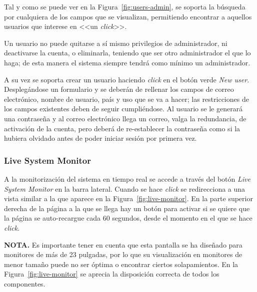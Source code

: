 Tal y como se puede ver en la Figura~\ref{fig:users-admin}, se soporta la búsqueda por cualquiera de los campos que se visualizan, permitiendo encontrar a aquellos usuarios que interese en <<un \textit{click}>>. 


Un usuario no puede quitarse a sí mismo privilegios de administrador, ni deactivarse la cuenta, o eliminarla, teniendo que ser otro administrador el que lo haga; de esta manera el sistema siempre tendrá como mínimo un administrador.

A su vez se soporta crear un usuario haciendo \textit{click} en el botón verde \textit{New user}. Desplegándose un formulario y se deberán de rellenar los campos de correo electrónico, nombre de usuario, país y uso que se va a hacer; las restricciones de los campos existentes deben de seguir cumpliéndose. Al usuario se le generará una contraseña y al correo electrónico llega un correo, valga la redundancia, de activación de la cuenta, pero deberá de re-establecer la contraseña como si la hubiera olvidado antes de poder iniciar sesión por primera vez.

\subsubsection{Live System Monitor}
A la monitorización del sistema en tiempo real se accede a través del botón \textit{Live System Monitor} en la barra lateral. Cuando se hace \textit{click} se redirecciona a una vista similar a la que aparece en la Figura~\ref{fig:live-monitor}. En la parte superior derecha de la página a la que se llega hay un botón para activar si se quiere que la página se auto-recargue cada 60 segundos, desde el momento en el que se hace \textit{click}.


\textbf{NOTA.} Es importante tener en cuenta que esta pantalla se ha diseñado para monitores de más de 23 pulgadas, por lo que su visualización en monitores de menor tamaño puede no ser óptima o encontrar ciertos solapamientos. En la Figura~\ref{fig:live-monitor} se aprecia la disposición correcta de todos los componentes.

